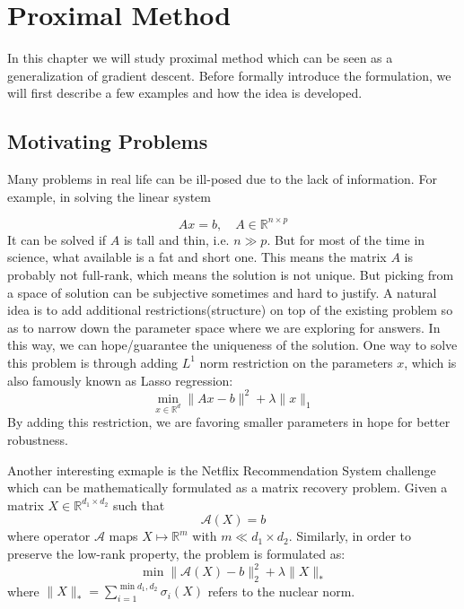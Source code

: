 \chapter{Proximal Method}
In this chapter we will study proximal method which can be seen as a generalization of gradient descent. Before formally introduce the formulation, we will first describe a few examples and how the idea is developed. 

\section{Motivating Problems}
Many problems in real life can be ill-posed due to the lack of information. For example, in solving the linear system

\begin{equation*}
    Ax = b, \quad A \in \mathbb{R}^{n \times p}
\end{equation*}
It can be solved if $A$ is tall and thin, i.e. $n \gg p$. But for most of the time in science, what available is a fat and short one. This means the matrix $A$ is probably not full-rank, which means the solution is not unique. But picking from a space of solution can be subjective sometimes and hard to justify. A natural idea is to add additional restrictions(structure) on top of the existing problem so as to narrow down the parameter space where we are exploring for answers. In this way, we can hope/guarantee the uniqueness of the solution. One way to solve this problem is through adding $L^1$ norm restriction on the parameters $x$, which is also famously known as Lasso regression:
\begin{equation*}
    \min_{x \in \mathbb{R}^d} \|Ax - b\|^2 + \lambda\|x\|_1
\end{equation*}
By adding this restriction, we are favoring smaller parameters in hope for better robustness. 

Another interesting exmaple is the Netflix Recommendation System challenge which can be mathematically formulated as a matrix recovery problem. Given a matrix $X \in \mathbb{R}^{d_1 \times d_2}$ such that
\begin{equation*}
    \mathcal{A}(X) = b
\end{equation*}
where operator $\mathcal{A}$ maps $X \mapsto \mathbb{R}^m$ with $m \ll d_1 \times d_2$. Similarly, in order to preserve the low-rank property, the problem is formulated as:
\begin{equation*}
    \min \|\mathcal{A}(X) - b \|^2_2 + \lambda\|X\|_*
\end{equation*}
where $\| X \|_* = \sum_{i=1}^{\min d_1, d_2}\sigma_i(X)$ refers to the nuclear norm.

